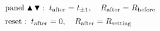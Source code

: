 \documentclass[12pt]{article}
\begin{document}
\[\begin{array}{@{}l@{}}
  \text{panel } \blacktriangle\,\blacktriangledown :\;
    t_{\mathrm{after}} = t_{\pm 1}, \quad R_{\mathrm{after}} = R_{\mathrm{before}} \\[5pt]
  \text{reset} :\; t_{\mathrm{after}} = 0, \quad R_{\mathrm{after}} = R_{\mathrm{setting}}
\end{array}\]
\end{document}
